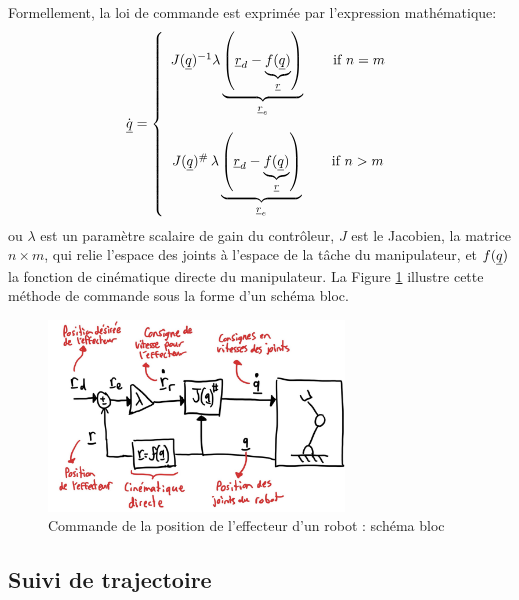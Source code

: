 Formellement, la loi de commande est exprimée par l'expression mathématique:
\begin{align}
\dot{\underline{q}} = \left\{ \begin{array}{c}
 J(\underline{q})^{-1} \lambda 
 \underbrace{ \left( \underline{r}_d  - \underbrace{f(\underline{q})}_{\underline{r}}  \right) }_{\underline{r}_e} 
 \quad\quad \text{if $n=m$}
 \\ \\
 J(\underline{q})^{\#} \, \lambda  \underbrace{ \left( \underline{r}_d  - \underbrace{f(\underline{q})}_{\underline{r}}  \right) }_{\underline{r}_e}    \quad\quad \text{if $n>m$}
\end{array}
\right.
\end{align}
ou $\lambda$ est un paramètre scalaire de gain du contrôleur, $J$ est le Jacobien, la matrice $n \times m$, qui relie l'espace des joints à l'espace de la tâche du manipulateur, et $f(\underline{q})$ la fonction de cinématique directe du manipulateur. La Figure \ref{fig:robotspeedcontrolpos} illustre cette méthode de commande sous la forme d'un schéma bloc. 
\begin{figure}[H]
	\centering
		\includegraphics[width=0.7\textwidth]{fig/robotspeedcontrolpos.jpg}
	\caption{Commande de la position de l'effecteur d'un robot : schéma bloc}
	\label{fig:robotspeedcontrolpos}
\end{figure}









\subsection{Suivi de trajectoire}
\label{sec:trajcontrol}


